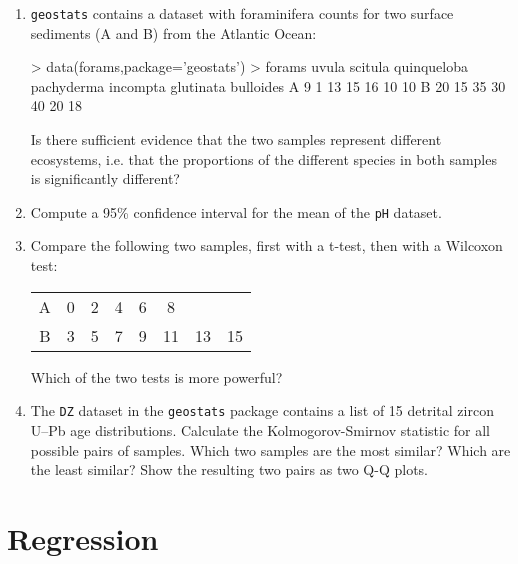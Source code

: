 \begin{enumerate}

\item \texttt{geostats} contains a dataset with foraminifera counts
  for two surface sediments (A and B) from the Atlantic Ocean:

\begin{console}
> data(forams,package='geostats')
> forams
  uvula scitula quinqueloba pachyderma incompta glutinata bulloides
A     9       1          13         15       16        10        10
B    20      15          35         30       40        20        18
\end{console}

Is there sufficient evidence that the two samples represent different
ecosystems, i.e. that the proportions of the different species in both
samples is significantly different?

\item Compute a 95\% confidence interval for the mean of the
  \texttt{pH} dataset.

\item Compare the following two samples, first with a t-test, then
  with a Wilcoxon test:
\begin{center}
\begin{tabular}{c|ccccccc}
A & 0 & 2 & 4 & 6 & 8 & & \\
B & 3 & 5 & 7 & 9 & 11 & 13 & 15
\end{tabular}
\end{center}
Which of the two tests is more powerful?
  
\item The \texttt{DZ} dataset in the \texttt{geostats} package
  contains a list of 15 detrital zircon U--Pb age
  distributions. Calculate the Kolmogorov-Smirnov statistic for all
  possible pairs of samples. Which two samples are the most similar?
  Which are the least similar? Show the resulting two pairs as two Q-Q
  plots.
  
\end{enumerate}

\section{Regression}
\label{sec:ex-regression}

